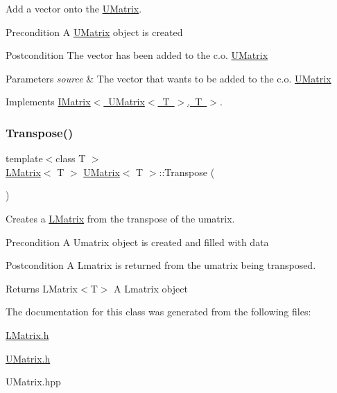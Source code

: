 Add a vector onto the \mbox{\hyperlink{class_u_matrix}{U\+Matrix}}. 

\begin{DoxyPrecond}{Precondition}
A \mbox{\hyperlink{class_u_matrix}{U\+Matrix}} object is created 
\end{DoxyPrecond}
\begin{DoxyPostcond}{Postcondition}
The vector has been added to the c.\+o. \mbox{\hyperlink{class_u_matrix}{U\+Matrix}}
\end{DoxyPostcond}

\begin{DoxyParams}{Parameters}
{\em source} & The vector that wants to be added to the c.\+o. \mbox{\hyperlink{class_u_matrix}{U\+Matrix}} \\
\hline
\end{DoxyParams}


Implements \mbox{\hyperlink{class_i_matrix_aa5de147c7aa5b74b0f2177ed1a8158de}{I\+Matrix$<$ U\+Matrix$<$ T $>$, T $>$}}.

\mbox{\label{class_u_matrix_a7b8f7cc5acf42e18dcaabbc49533c6b8}} 
\subsubsection{\texorpdfstring{Transpose()}{Transpose()}}
{\footnotesize\ttfamily template$<$class T $>$ \\
\mbox{\hyperlink{class_l_matrix}{L\+Matrix}}$<$ T $>$ \mbox{\hyperlink{class_u_matrix}{U\+Matrix}}$<$ T $>$\+::Transpose (\begin{DoxyParamCaption}{ }\end{DoxyParamCaption})}



Creates a \mbox{\hyperlink{class_l_matrix}{L\+Matrix}} from the transpose of the umatrix. 

\begin{DoxyPrecond}{Precondition}
A Umatrix object is created and filled with data 
\end{DoxyPrecond}
\begin{DoxyPostcond}{Postcondition}
A Lmatrix is returned from the umatrix being transposed.
\end{DoxyPostcond}
\begin{DoxyReturn}{Returns}
L\+Matrix$<$\+T$>$ A Lmatrix object 
\end{DoxyReturn}


The documentation for this class was generated from the following files\+:\begin{DoxyCompactItemize}
\item 
\mbox{\hyperlink{_l_matrix_8h}{L\+Matrix.\+h}}\item 
\mbox{\hyperlink{_u_matrix_8h}{U\+Matrix.\+h}}\item 
U\+Matrix.\+hpp\end{DoxyCompactItemize}
